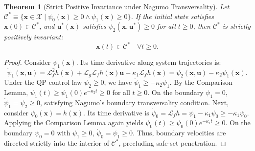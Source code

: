 \documentclass[11pt,onecolumn]{article}
\newtheorem{theorem}{Theorem}
\begin{document}
\begin{theorem}[Strict Positive Invariance under Nagumo Transversality]
\label{thm:hocbf_forward_invariance}
Let $\mathcal{C}^* \equiv \{ \mathbf{x} \in \mathcal{X} \mid \psi_0(\mathbf{x}) \ge 0 \land \psi_1(\mathbf{x}) \ge 0 \}$. If the initial state satisfies $\mathbf{x}(0) \in \mathcal{C}^*$, and $\mathbf{u}^*(\mathbf{x})$ satisfies $\psi_2(\mathbf{x}, \mathbf{u}^*) \ge 0$ for all $t \ge 0$, then $\mathcal{C}^*$ is strictly positively invariant:
\begin{equation}
    \mathbf{x}(t) \in \mathcal{C}^* \quad \forall t \ge 0.
\end{equation}
\end{theorem}

\begin{proof}
Consider $\psi_1(\mathbf{x})$. Its time derivative along system trajectories is:
\begin{equation}
    \dot{\psi}_1(\mathbf{x}, \mathbf{u}) = \mathcal{L}_f^2 h(\mathbf{x}) + \mathcal{L}_g \mathcal{L}_f h(\mathbf{x})\mathbf{u} + \kappa_1 \mathcal{L}_f h(\mathbf{x}) = \psi_2(\mathbf{x}, \mathbf{u}) - \kappa_2 \psi_1(\mathbf{x}).
\end{equation}
Under the QP control law $\psi_2 \ge 0$, we have $\dot{\psi}_1 \ge -\kappa_2 \psi_1$. By the Comparison Lemma, $\psi_1(t) \ge \psi_1(0) e^{-\kappa_2 t} \ge 0$ for all $t \ge 0$. On the boundary $\psi_1 = 0$, $\dot{\psi}_1 = \psi_2 \ge 0$, satisfying Nagumo's boundary transversality condition. Next, consider $\psi_0(\mathbf{x}) = h(\mathbf{x})$. Its time derivative is $\dot{\psi}_0 = \mathcal{L}_f h = \psi_1 - \kappa_1 \psi_0 \ge -\kappa_1 \psi_0$. Applying the Comparison Lemma again yields $\psi_0(t) \ge \psi_0(0) e^{-\kappa_1 t} \ge 0$. On the boundary $\psi_0 = 0$ with $\psi_1 \ge 0$, $\dot{\psi}_0 = \psi_1 \ge 0$. Thus, boundary velocities are directed strictly into the interior of $\mathcal{C}^*$, precluding safe-set penetration.
\end{proof}

\FloatBarrier
\end{document}
